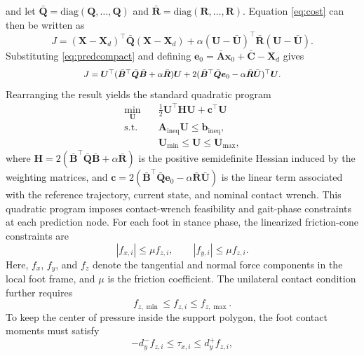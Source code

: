 \documentclass[5p,times]{elsarticle}
\begin{document}
and let $\bar{\bm Q}=\mathrm{diag}(\bm Q,\ldots,\bm Q)$ and $\bar{\bm R}=\mathrm{diag}(\bm R,\ldots,\bm R)$. Equation \eqref{eq:cost} can then be written as
\begin{equation}
J=(\bm X-\bm X_d)^\top\bar{\bm Q}(\bm X-\bm X_d)
+\alpha(\bm U-\bar{\bm U})^\top\bar{\bm R}(\bm U-\bar{\bm U}).
\label{eq:stacked_cost}
\end{equation}
Substituting \eqref{eq:predcompact} and defining $\bm e_0=\bar{\bm A}\bm x_0+\bar{\bm C}-\bm X_d$ gives
\begin{equation}
\scalebox{0.88}{$
J=\bm U^\top(\bar{\bm B}^\top\bar{\bm Q}\bar{\bm B}+\alpha\bar{\bm R})\bm U
+2(\bar{\bm B}^\top\bar{\bm Q}\bm e_0-\alpha\bar{\bm R}\bar{\bm U})^\top\bm U.
$}
\label{eq:expanded_cost}
\end{equation}
Rearranging the result yields the standard quadratic program
\begin{equation}
\begin{aligned}
\min_{\bm U}\quad
&\frac{1}{2}\bm U^\top \bm H\bm U+\bm c^\top\bm U\\
\mathrm{s.t.}\quad
&\bm A_{\text{ineq}}\bm U\le \bm b_{\text{ineq}},\\
&\bm U_{\min}\le \bm U\le \bm U_{\max},
\end{aligned}
\label{eq:qpcompact}
\end{equation}
where $\bm H=2(\bar{\bm B}^\top\bar{\bm Q}\bar{\bm B}+\alpha\bar{\bm R})$ is the positive semidefinite Hessian induced by the weighting matrices, and $\bm c=2(\bar{\bm B}^\top\bar{\bm Q}\bm e_0-\alpha\bar{\bm R}\bar{\bm U})$ is the linear term associated with the reference trajectory, current state, and nominal contact wrench. This quadratic program imposes contact-wrench feasibility and gait-phase constraints at each prediction node. For each foot in stance phase, the linearized friction-cone constraints are
\begin{equation}
|f_{x,i}|\le \mu f_{z,i},\qquad |f_{y,i}|\le \mu f_{z,i}.
\label{eq:c_fric}
\end{equation}
Here, $f_x$, $f_y$, and $f_z$ denote the tangential and normal force components in the local foot frame, and $\mu$ is the friction coefficient. The unilateral contact condition further requires
\begin{equation}
f_{z,\min}\le f_{z,i}\le f_{z,\max}.
\label{eq:c_normal}
\end{equation}
To keep the center of pressure inside the support polygon, the foot contact moments must satisfy
\begin{equation}
-d_y^- f_{z,i}\le \tau_{x,i}\le d_y^+ f_{z,i},
\label{eq:c_copx}
\end{equation}
\end{document}
